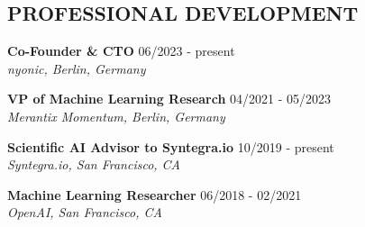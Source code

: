\documentclass[10pt,centered]{./res} %
\begin{document}
\vspace*{-1.5cm}
\begin{resume}
\vspace{0.4cm}


\section{\color{ResumeBlue}PROFESSIONAL DEVELOPMENT}
{\bf Co-Founder \& CTO} \hfill06/2023 - present \\
{\it nyonic, Berlin, Germany}

{\bf VP of Machine Learning Research} \hfill04/2021 - 05/2023 \\
{\it Merantix Momentum, Berlin, Germany}

{\bf Scientific AI Advisor to Syntegra.io } \hfill10/2019 - present \\
{\it Syntegra.io, San Francisco, CA}

{\bf Machine Learning Researcher} \hfill06/2018 - 02/2021 \\
{\it OpenAI, San Francisco, CA}


\end{resume}
\end{document}
